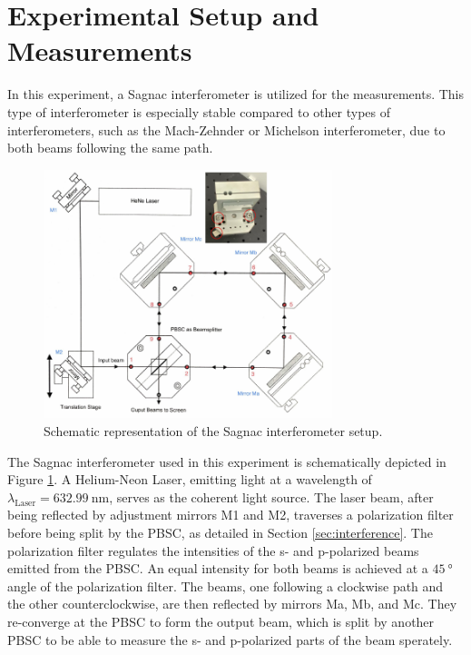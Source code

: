 \section{Experimental Setup and Measurements}
\label{sec:procedure}
In this experiment, a Sagnac interferometer is utilized for the measurements. 
This type of interferometer is especially stable compared to other types
of interferometers, such as the Mach-Zehnder or Michelson interferometer, due to
both beams following the same path.

\begin{figure}
    \centering
    \includegraphics[width=0.75\textwidth]{pictures/Sagnac.png}
    \caption{Schematic representation of the Sagnac interferometer setup. \cite{V64}}
    \label{fig:sagnac}
\end{figure}

The Sagnac interferometer used in this experiment is schematically depicted in Figure \ref{fig:sagnac}. 
A Helium-Neon Laser, emitting light at a wavelength of $\lambda_\text{Laser} = \SI{632.99}{\nano\meter}$, 
serves as the coherent light source. The laser beam, after being reflected by adjustment mirrors M1 and M2, 
traverses a polarization filter before being split by the PBSC, as detailed 
in Section \ref{sec:interference}. The polarization filter regulates the intensities of the s- and p-polarized 
beams emitted from the PBSC. An equal intensity for both beams is achieved at a $\SI{45}{\degree}$ angle 
of the polarization filter. The beams, one following a clockwise path and the other counterclockwise, are 
then reflected by mirrors Ma, Mb, and Mc.
They re-converge at the PBSC to form the output beam, 
which is split by another PBSC to be able to measure 
the s- and p-polarized parts of the beam sperately. 

